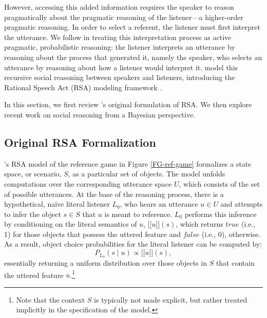 \documentclass[11pt,a4paper]{article}
\newcommand{\sem}[1]{\mbox{$[\![$#1$]\!]$}}
\begin{document}
However, accessing this added information requires the speaker to reason pragmatically about the pragmatic reasoning of the listener---a higher-order pragmatic reasoning.
In order to select a referent, the listener must first interpret the utterance. We follow  in treating this interpretation process as active pragmatic, probabilistic reasoning: the listener interprets an utterance by reasoning about the process that generated it, namely the speaker, who selects an utterance by reasoning about how a listener would interpret it. \citeauthor{frankgoodman2012} model this recursive social reasoning between speakers and listeners, introducing the Rational Speech Act (RSA) modeling framework \cite{frankgoodman2012,frankejaeger2016,goodmanfrank2016}.

In this section, we first review  \citeauthor{frankgoodman2012}'s original formulation of RSA. We then explore recent work on social reasoning from a Bayesian perspective.

\subsection{Original RSA Formalization} \label{rsa}

\citeauthor{frankgoodman2012}'s RSA model of the reference game in Figure \ref{FG-ref-game} formalizes a state space, or scenario, $S$, as a particular set of objects. %
The model unfolds computations over the corresponding utterance space $U$, which consists of the set of possible utterances. %
At the base of the reasoning process, there is a hypothetical, na\"ive literal listener $L_0$, who hears an utterance $u\in U$ and attempts to infer the object $s \in S$ that $u$ is meant to reference. 
$L_0$ performs this inference by conditioning on the literal semantics of $u$, \sem{$u$}$(s)$, which returns $true$ (i.e., 1) for those objects that possess the uttered feature and $false$ (i.e., 0), otherwise.
As a result, object choice probabilities for the literal listener can be computed by: 
\begin{equation}
P_{L_{0}}(s\mid u) \propto \sem{$u$}(s),
\end{equation}
essentially returning a uniform distribution over those objects in $S$ that contain the uttered feature $u$.\footnote{Note that the context $S$ is typically not made explicit, but rather treated implicitly in the specification of the model.}
\end{document}
